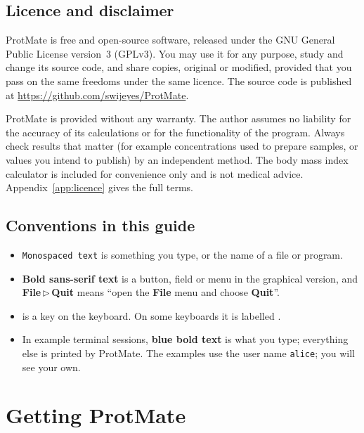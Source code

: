 \documentclass[11pt,a4paper,oneside]{report}
\newcommand{\repourl}{https://github.com/swijeyes/ProtMate}
\newcommand{\repo}{\url{\repourl}}
\newcommand{\cmd}[1]{\texttt{#1}}            %
\newcommand{\key}[1]{\fbox{\footnotesize\textsf{#1}}}
\newcommand{\gui}[1]{\textsf{\textbf{#1}}}  %
\newcommand{\menupath}[2]{\gui{#1}\,$\triangleright$\,\gui{#2}}
\newcommand{\inp}[1]{\textbf{\textcolor{pmblue}{#1}}}
\begin{document}
\section{Licence and disclaimer}

ProtMate is free and open-source software, released under the GNU General Public License
version~3 (GPLv3). You may use it for any purpose, study and change its source code, and share
copies, original or modified, provided that you pass on the same freedoms under the same licence.
The source code is published at \repo.

\begin{warning}[Disclaimer]
ProtMate is provided without any warranty. The author assumes no liability for the accuracy of its
calculations or for the functionality of the program. Always check results that matter (for example
concentrations used to prepare samples, or values you intend to publish) by an independent method.
The body mass index calculator is included for convenience only and is not medical advice.
Appendix~\ref{app:licence} gives the full terms.
\end{warning}

\section{Conventions in this guide}

\begin{itemize}
  \item \cmd{Monospaced text} is something you type, or the name of a file or program.
  \item \gui{Bold sans-serif text} is a button, field or menu in the graphical version, and
        \menupath{File}{Quit} means ``open the \gui{File} menu and choose \gui{Quit}''.
  \item \key{Return} is a key on the keyboard. On some keyboards it is labelled \key{Enter}.
  \item In example terminal sessions, \inp{blue bold text} is what you type; everything else is
        printed by ProtMate. The examples use the user name \cmd{alice}; you will see your own.
\end{itemize}

\chapter{Getting ProtMate}
\end{document}
